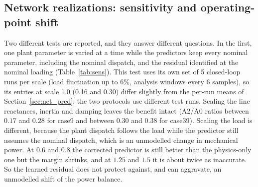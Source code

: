 \documentclass[preprint,12pt]{elsarticle}
\begin{document}
\subsection{Network realizations: sensitivity and operating-point shift}
\label{sec:sens}
Two different tests are reported, and they answer different questions. In the first, one plant parameter is varied at a time while the predictors keep every nominal parameter, including the nominal dispatch, and the residual identified at the nominal loading (Table~\ref{tab:sens}). This test uses its own set of 5 closed-loop runs per scale (load fluctuation up to $6\%$, analysis windows every 6 samples), so its entries at scale 1.0 (0.16 and 0.30) differ slightly from the per-run means of Section~\ref{sec:net_pred}; the two protocols use different test runs. Scaling the line reactances, inertia and damping leaves the benefit intact (A2/A0 ratios between $0.17$ and $0.28$ for case9 and between $0.30$ and $0.38$ for case39). Scaling the load is different, because the plant dispatch follows the load while the predictor still assumes the nominal dispatch, which is an unmodelled change in mechanical power. At $0.6$ and $0.8$ the corrected predictor is still better than the physics-only one but the margin shrinks, and at $1.25$ and $1.5$ it is about twice as inaccurate. So the learned residual does not protect against, and can aggravate, an unmodelled shift of the power balance.
\end{document}
